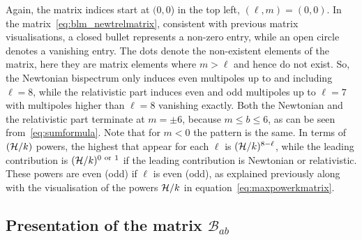 Again, the matrix indices start at $(0,0$) in the top left, $(\ell,m) = (0,0)$. In the matrix~\eqref{eq:blm_newtrelmatrix}, consistent with previous matrix visualisations, a closed bullet represents a non-zero entry, while an open circle denotes a vanishing entry. The dots denote the non-existent elements of the matrix, here they are matrix elements where \(m > \ell\) and hence do not exist.
So, the Newtonian bispectrum only induces even multipoles up to and including $\ell=8$, while the relativistic part induces even and odd multipoles up to $\ell=7$ with multipoles higher than $\ell = 8$ vanishing exactly. Both the Newtonian and the relativistic part terminate at $m=\pm6$, because $m\leq b\leq6$, as can  be seen from~\eqref{eq:sumformula}. Note that for $m<0$ the pattern is the same.	
In terms of $({\cal H}/k)$ powers, the highest that appear for each $\ell$ is $({\cal H}/k)^{8-\ell}$, while the leading contribution is $({\cal H}/k)^{0~\text{or}~1}$ if the leading contribution is Newtonian or relativistic. These powers are even (odd) if $\ell$ is even (odd), as explained previously along with the visualisation of the powers $\mathcal{H}/k$ in equation~\eqref{eq:maxpowerkmatrix}.


\subsection*{Presentation of the matrix $\mathcal{B}_{ab}$}

